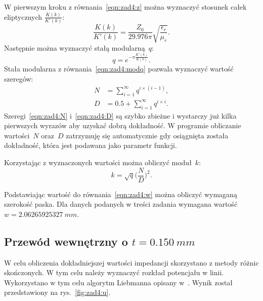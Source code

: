\documentclass[rep.tex]{subfiles}
\begin{document}
W pierwszym kroku z równania~\ref{eqn:zad4:z} można wyznaczyć stosunek całek eliptycznych $\frac{K(k)}{K'(k)}$:
\begin{equation}
  \frac{K(k)}{K'(k)} = \frac{Z_0}{29.976 \pi}\sqrt{\frac{\epsilon_r}{\mu_r}}. \label{eqn:zad4:modk}
\end{equation}
Następnie można wyznaczyć stałą modularną~$q$:
\begin{equation}
  q = e^{- \pi \frac{K'(k)}{K(k)}}. \label{eqn:zad4:modq}
\end{equation}
Stała modularna z równania~\ref{eqn:zad4:modq} pozwala wyznaczyć wartość szeregów:
\begin{align}
  N &= \sum_{i=1}^\infty q^{i \times (i-1)}, \label{eqn:zad4:N} \\
  D &= 0.5 + \sum_{i=1}^\infty q^{i \times i}. \label{eqn:zad4:D}
\end{align}
Szeregi~\ref{eqn:zad4:N} i~\ref{eqn:zad4:D} są szybko zbieżne i wystarczy już kilka pierwszych wyrazów aby uzyskać dobrą dokładność.
W programie obliczanie wartości~$N$ oraz~$D$ zatrzymuję się automatycznie gdy osiągnięta została dokładność,
która jest podawana jako parametr funkcji.

Korzystając z wyznaczonych wartości można obliczyć moduł~$k$:
\begin{equation}
  k = \sqrt{q} \Big(\frac{N}{D}\Big)^2.
\end{equation}

Podstawiając wartość do równania~\ref{eqn:zad4:w} można obliczyć wymaganą szerokość paska.
Dla danych podanych w treści zadania wymagana wartość $w = 2.06265925327~mm$.

\subsection{Przewód wewnętrzny o $t = 0.150~mm$}
\label{zad4:thick}
W celu obliczenia dokładniejszej wartości impedancji skorzystano z metody różnic skończonych.
W tym celu należy wyznaczyć rozkład potencjału w linii.
Wykorzystano w tym celu algorytm Liebmanna opisany w~\cite{num}.
Wynik został przedstawiony na rys.~\ref{fig:zad4:u}.
\end{document}
